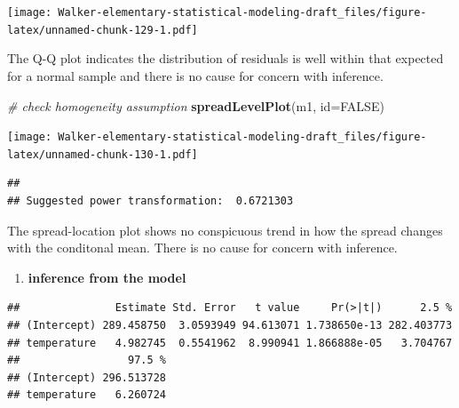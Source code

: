 \documentclass[]{book}
\newenvironment{Shaded}{\begin{snugshade}}{\end{snugshade}}
\newcommand{\CommentTok}[1]{\textcolor[rgb]{0.56,0.35,0.01}{\textit{#1}}}
\newcommand{\DataTypeTok}[1]{\textcolor[rgb]{0.13,0.29,0.53}{#1}}
\newcommand{\KeywordTok}[1]{\textcolor[rgb]{0.13,0.29,0.53}{\textbf{#1}}}
\newcommand{\NormalTok}[1]{#1}
\newcommand{\OperatorTok}[1]{\textcolor[rgb]{0.81,0.36,0.00}{\textbf{#1}}}
\newcommand{\OtherTok}[1]{\textcolor[rgb]{0.56,0.35,0.01}{#1}}
\newcommand{\StringTok}[1]{\textcolor[rgb]{0.31,0.60,0.02}{#1}}
\providecommand{\tightlist}{%
  \setlength{\itemsep}{0pt}\setlength{\parskip}{0pt}}
\begin{document}
\texttt{[image: Walker-elementary-statistical-modeling-draft\_files/figure-latex/unnamed-chunk-129-1.pdf]}

The Q-Q plot indicates the distribution of residuals is well within that expected for a normal sample and there is no cause for concern with inference.

\begin{Shaded}
\begin{Highlighting}[]
\CommentTok{# check homogeneity assumption}
\KeywordTok{spreadLevelPlot}\NormalTok{(m1, }\DataTypeTok{id=}\OtherTok{FALSE}\NormalTok{)}
\end{Highlighting}
\end{Shaded}

\texttt{[image: Walker-elementary-statistical-modeling-draft\_files/figure-latex/unnamed-chunk-130-1.pdf]}

\begin{verbatim}
## 
## Suggested power transformation:  0.6721303
\end{verbatim}

The spread-location plot shows no conspicuous trend in how the spread changes with the conditonal mean. There is no cause for concern with inference.

\begin{enumerate}
\def\labelenumi{\arabic{enumi}.}
\setcounter{enumi}{4}
\tightlist
\item
  \textbf{inference from the model}
\end{enumerate}

\begin{Shaded}
\end{Shaded}

\begin{verbatim}
##               Estimate Std. Error   t value     Pr(>|t|)      2.5 %
## (Intercept) 289.458750  3.0593949 94.613071 1.738650e-13 282.403773
## temperature   4.982745  0.5541962  8.990941 1.866888e-05   3.704767
##                 97.5 %
## (Intercept) 296.513728
## temperature   6.260724
\end{verbatim}
\end{document}
